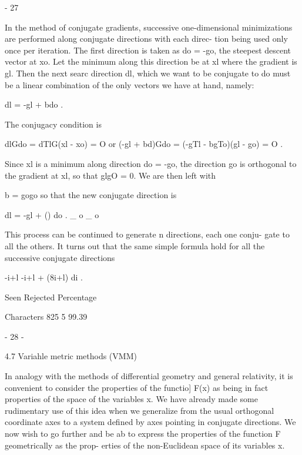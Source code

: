                                  - 27
 
 
     In the method of conjugate gradients, successive one-dimensional
minimizations are performed along conjugate directions with each direc-
tion being used only once per iteration.  The first direction is taken
as do = -go, the steepest descent vector at xo.  Let the minimum along
this direction be at xl where the gradient is gl.  Then the next  searc
direction dl, which we want to be conjugate to do must be a linear
combination of the only vectors we have at hand, namely:
 
                             dl = -gl + bdo .
 
 
The conjugacy condition is
 
 
                        dlGdo = dTlG(xl - xo) = O
or
                (-gl + bd)Gdo = (-gTl - bgTo)(gl - go) = O .
 
 
Since xl is a minimum along direction do = -go, the direction go is
orthogonal to the gradient at xl, so that glgO = 0.  We are then left
with
 
                                b =
                                    gogo
so that the new conjugate direction is
 
 
                      dl = -gl + () do .
                                _ o _ o
 
 
This process can be continued to generate n directions, each one conju-
gate to all the others.  It turns out that the same simple formula hold
for all the successive conjugate directions
 
 
 
 
                  -i+l -i+l + (8i+l) di .
 
                 Seen Rejected  Percentage
 
Characters        825        5   99.39
 
                                 - 28 -
 
 
4.7  Variahle metric methods (VMM)
 
     In analogy with the methods of differential geometry and general
relativity, it is convenient to consider the properties of the functio]
F(x) as being in fact properties of the space of the variables x.  We
have already made some rudimentary use of this idea when we generalize
from the usual orthogonal coordinate axes to a system defined by axes
pointing in conjugate directions.  We now wish to go further and be ab
to express the properties of the function F geometrically as the prop-
erties of the non-Euclidean space of its variables x.
 
